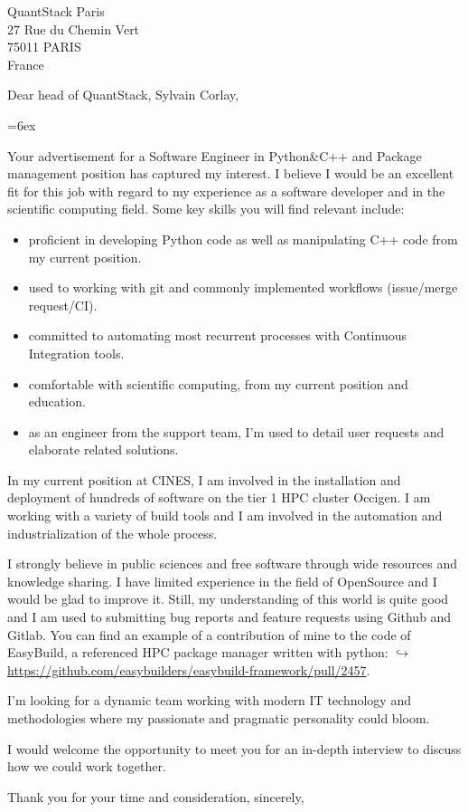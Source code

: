\documentclass[10pt,a4paper]{lettre}
\begin{document}
\begin{letter}{QuantStack Paris\\27 Rue du Chemin Vert\\75011 PARIS\\France}
\address{Victor Cameo Ponz\\3 rue Tour Gayraud\\34 070 Montpellier}
\nofax

\opening{Dear head of QuantStack, Sylvain Corlay,}

\parindent=6ex

Your advertisement for a Software Engineer in Python\&C++ and Package
management position has captured my interest. I believe I would be an excellent
fit for this job with regard to my experience as a software developer and in the
scientific computing field. Some key skills you will find relevant include:

\begin{itemize}
    \item proficient in developing Python code as well as manipulating C++ code from my
current position.
    \item used to working with git and commonly implemented workflows (issue/merge
request/CI).
    \item committed to automating most recurrent processes with Continuous Integration
tools.
    \item comfortable with scientific computing, from my current position and education.
    \item as an engineer from the support team, I'm used to detail user requests and
elaborate related solutions.
\end{itemize}


In my current position at CINES, I am involved in the installation and deployment
of hundreds of software on the tier 1 HPC cluster Occigen. I am working with
a variety of build tools and I am involved in the automation and industrialization
of the whole process.

I strongly believe in public sciences and free software through wide resources and
knowledge sharing. I have limited experience in the field of OpenSource and I
would be glad to improve it. Still, my understanding of this world is quite good
and I am used to submitting bug reports and feature requests using Github and Gitlab.
You can find an example of a contribution of mine to the code of EasyBuild, a
referenced HPC package manager written with python:
\href{https://github.com/easybuilders/easybuild-framework/pull/2457}
{$\hookrightarrow$ https://github.com/easybuilders/easybuild-framework/pull/2457}.

I'm looking for a dynamic team working with modern IT technology and
methodologies where my passionate and pragmatic personality could bloom.

I would welcome the opportunity to meet you for an in-depth interview to discuss
how we could work together.

\closing{Thank you for your time and consideration, sincerely,}
\end{letter}
\end{document}
